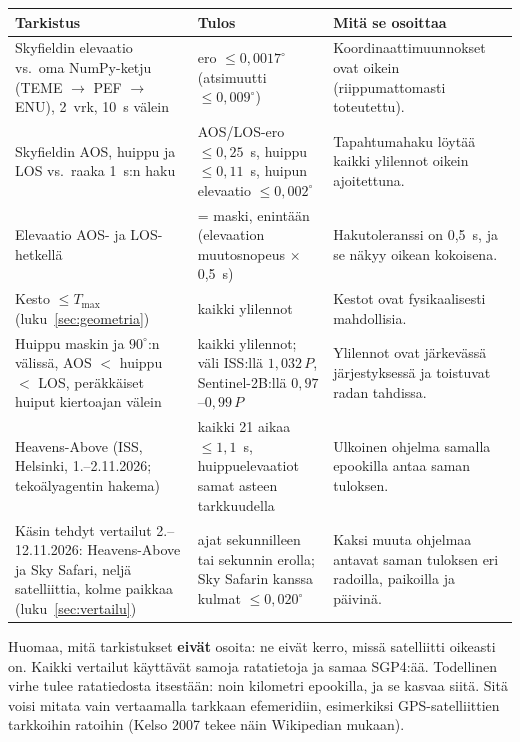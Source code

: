 \documentclass[a4paper,11pt]{article}
\begin{document}
\begin{center}
\small
\begin{tabularx}{\textwidth}{@{}L L L@{}}
\toprule
Tarkistus & Tulos & Mitä se osoittaa \\
\midrule
Skyfieldin elevaatio vs.\ oma NumPy-ketju (TEME $\to$ PEF $\to$ ENU), 2~vrk, 10~s välein & ero $\leq 0,0017^\circ$ (atsimuutti $\leq 0,009^\circ$) & Koordinaattimuunnokset ovat oikein (riippumattomasti toteutettu). \\
\addlinespace
Skyfieldin AOS, huippu ja LOS vs.\ raaka 1~s:n haku & AOS/LOS-ero $\leq 0,25$~s, huippu $\leq 0,11$~s, huipun elevaatio $\leq 0,002^\circ$ & Tapahtumahaku löytää kaikki ylilennot oikein ajoitettuna. \\
\addlinespace
Elevaatio AOS- ja LOS-hetkellä & = maski, enintään (elevaation muutosnopeus $\times$ 0,5~s) & Hakutoleranssi on 0,5~s, ja se näkyy oikean kokoisena. \\
\addlinespace
Kesto $\leq T_\text{max}$ (luku~\ref{sec:geometria}) & kaikki ylilennot & Kestot ovat fysikaalisesti mahdollisia. \\
\addlinespace
Huippu maskin ja $90^\circ$:n välissä, AOS $<$ huippu $<$ LOS, peräkkäiset huiput kiertoajan välein & kaikki ylilennot; väli ISS:llä $1{,}032\,P$, Sentinel-2B:llä $0{,}97$--$0{,}99\,P$ & Ylilennot ovat järkevässä järjestyksessä ja toistuvat radan tahdissa. \\
\addlinespace
Heavens-Above (ISS, Helsinki, 1.--2.11.2026; tekoälyagentin hakema) & kaikki 21 aikaa $\leq 1,1$~s, huippuelevaatiot samat asteen tarkkuudella & Ulkoinen ohjelma samalla epookilla antaa saman tuloksen. \\
\addlinespace
Käsin tehdyt vertailut 2.--12.11.2026: Heavens-Above ja Sky Safari, neljä satelliittia, kolme paikkaa (luku~\ref{sec:vertailu}) & ajat sekunnilleen tai sekunnin erolla; Sky Safarin kanssa kulmat $\leq 0{,}020^\circ$ & Kaksi muuta ohjelmaa antavat saman tuloksen eri radoilla, paikoilla ja päivinä. \\
\bottomrule
\end{tabularx}
\end{center}

Huomaa, mitä tarkistukset \textbf{eivät} osoita: ne eivät kerro, missä satelliitti oikeasti on. Kaikki vertailut käyttävät samoja ratatietoja ja samaa SGP4:ää. Todellinen virhe tulee ratatiedosta itsestään: noin kilometri epookilla, ja se kasvaa siitä. Sitä voisi mitata vain vertaamalla tarkkaan efemeridiin, esimerkiksi GPS-satelliittien tarkkoihin ratoihin (Kelso 2007 tekee näin Wikipedian mukaan).
\end{document}
